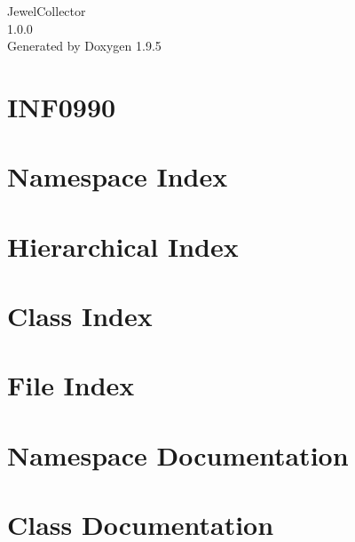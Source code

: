 \documentclass[twoside]{book}
\newcommand{\+}{\discretionary{\mbox{\scriptsize$\hookleftarrow$}}{}{}}
\newcommand{\clearemptydoublepage}{%
    \newpage{\pagestyle{empty}\cleardoublepage}%
  }
\begin{document}
  \raggedbottom
    \hypersetup{pageanchor=false,
                bookmarksnumbered=true,
                pdfencoding=unicode
               }
  \begin{titlepage}
  \vspace*{7cm}
  \begin{center}%
  {\Large Jewel\+Collector}\\
  [1ex]\large 1.\+0.\+0 \\
  \vspace*{1cm}
  {\large Generated by Doxygen 1.9.5}\\
  \end{center}
  \end{titlepage}
  \clearemptydoublepage
  \tableofcontents
  \clearemptydoublepage
  \hypersetup{pageanchor=true}
\chapter{INF0990}
\label{md_README}

\chapter{Namespace Index}

\chapter{Hierarchical Index}

\chapter{Class Index}

\chapter{File Index}

\chapter{Namespace Documentation}

\chapter{Class Documentation}










\end{document}
